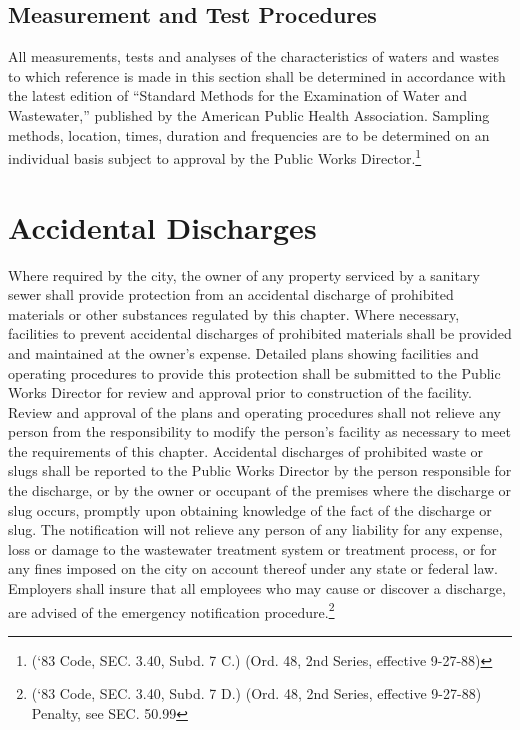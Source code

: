 \subsection{Measurement and Test Procedures}
All measurements, tests and analyses of the characteristics of waters and wastes to which reference is made in this section shall be determined in accordance with the latest edition of “Standard Methods for the Examination of Water and Wastewater,” published by the American Public Health Association.  Sampling methods, location, times, duration and frequencies are to be determined on an individual basis subject to approval by the Public Works Director.\footnote{(‘83 Code, SEC. 3.40, Subd. 7 C.) (Ord. 48, 2nd Series, effective 9-27-88)}

\section{Accidental Discharges}
Where required by the city, the owner of any property serviced by a sanitary sewer shall provide protection from an accidental discharge of prohibited materials or other substances regulated by this chapter.  Where necessary, facilities to prevent accidental discharges of prohibited materials shall be provided and maintained at the owner’s expense.  Detailed plans showing facilities and operating procedures to provide this protection shall be submitted to the Public Works Director for review and approval prior to construction of the facility.  Review and approval of the plans and operating procedures shall not relieve any person from the responsibility to modify the person’s facility as necessary to meet the requirements of this chapter.  Accidental discharges of prohibited waste or slugs shall be reported to the Public Works Director by the person responsible for the discharge, or by the owner or occupant of the premises where the discharge or slug occurs, promptly upon obtaining knowledge of the fact of the discharge or slug.  The notification will not relieve any person of any liability for any expense, loss or damage to the wastewater treatment system or treatment process, or for any fines imposed on the city on account thereof under any state or federal law.  Employers shall insure that all employees who may cause or discover a discharge, are advised of the emergency notification procedure.\footnote{(‘83 Code, SEC. 3.40, Subd. 7 D.) (Ord. 48, 2nd Series, effective 9-27-88) Penalty, see SEC. 50.99}

